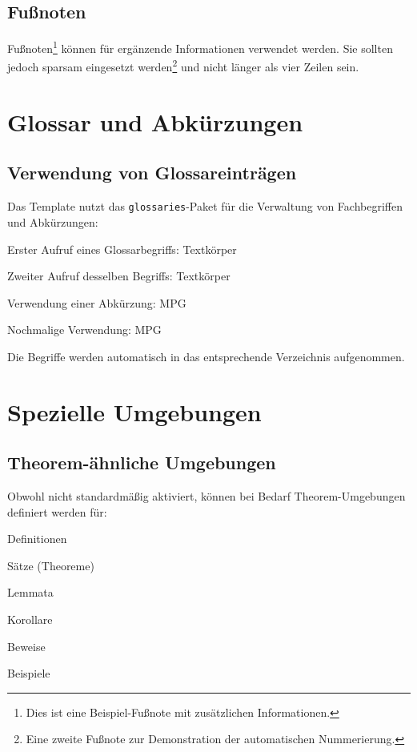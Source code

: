 \subsection*{Fußnoten}
\label{subsec:fussnoten_demo}

Fußnoten\footnote{Dies ist eine Beispiel-Fußnote mit zusätzlichen Informationen.} können für ergänzende Informationen verwendet werden. Sie sollten jedoch sparsam eingesetzt werden\footnote{Eine zweite Fußnote zur Demonstration der automatischen Nummerierung.} und nicht länger als vier Zeilen sein.

\section{Glossar und Abkürzungen}
\label{sec:glossar_demo}

\subsection*{Verwendung von Glossareinträgen}
\label{subsec:glossar_verwendung}

Das Template nutzt das \texttt{glossaries}-Paket für die Verwaltung von Fachbegriffen und Abkürzungen:
\begin{listenabsatz}
	\item Erster Aufruf eines Glossarbegriffs: \gls{Textkörper}
	\item Zweiter Aufruf desselben Begriffs: \gls{Textkörper}
	\item Verwendung einer Abkürzung: \gls{MPG}
	\item Nochmalige Verwendung: \gls{MPG}
\end{listenabsatz}

Die Begriffe werden automatisch in das entsprechende Verzeichnis aufgenommen.

\section{Spezielle Umgebungen}
\label{sec:spezielle_umgebungen}

\subsection*{Theorem-ähnliche Umgebungen}
\label{subsec:theoreme}

Obwohl nicht standardmäßig aktiviert, können bei Bedarf Theorem-Umgebungen definiert werden für:
\begin{listenabsatz}
	\item Definitionen
	\item Sätze (Theoreme)
	\item Lemmata
	\item Korollare
	\item Beweise
	\item Beispiele
\end{listenabsatz}

